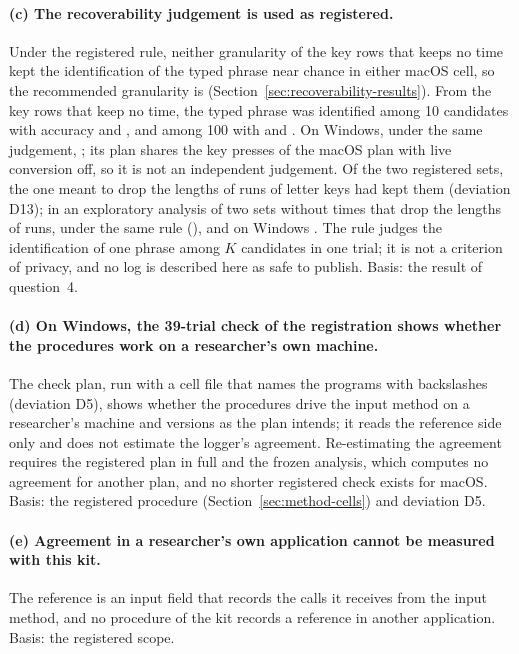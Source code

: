 \paragraph{(c) The recoverability judgement is used as registered.} Under the registered rule, neither granularity of
the key rows that keeps no time kept the identification of the typed phrase near chance in either macOS cell, so the
recommended granularity is  (Section~\ref{sec:recoverability-results}). From the key rows that
keep no time, the typed phrase was identified among 10 candidates with accuracy
 and , and among 100 with
 and . On Windows,
under the same judgement, ; its plan shares the key presses of the macOS plan with live
conversion off, so it is not an independent judgement. Of the two registered sets, the one meant to drop the lengths of
runs of letter keys had kept them (deviation D13); in an exploratory analysis of two sets without times that drop the
lengths of runs,  under the same rule (),
and on Windows . The rule judges the
identification of one phrase among $K$
candidates in one trial; it is not a criterion of privacy, and no log is described here as safe to publish. Basis: the
result of question~4.

\paragraph{(d) On Windows, the 39-trial check of the registration shows whether the procedures work on a researcher's
own machine.} The check plan, run with a cell file that names the programs with backslashes (deviation D5), shows whether
the procedures drive the input method on a researcher's machine and versions as the plan intends; it reads the reference
side only and does not estimate the logger's agreement. Re-estimating the agreement requires the registered plan in full
and the frozen analysis, which computes no agreement for another plan, and no shorter registered check exists for macOS.
Basis: the registered procedure (Section~\ref{sec:method-cells}) and deviation D5.

\paragraph{(e) Agreement in a researcher's own application cannot be measured with this kit.} The reference is an
input field that records the calls it receives from the input method, and no procedure of the kit records a reference
in another application. Basis: the registered scope.


